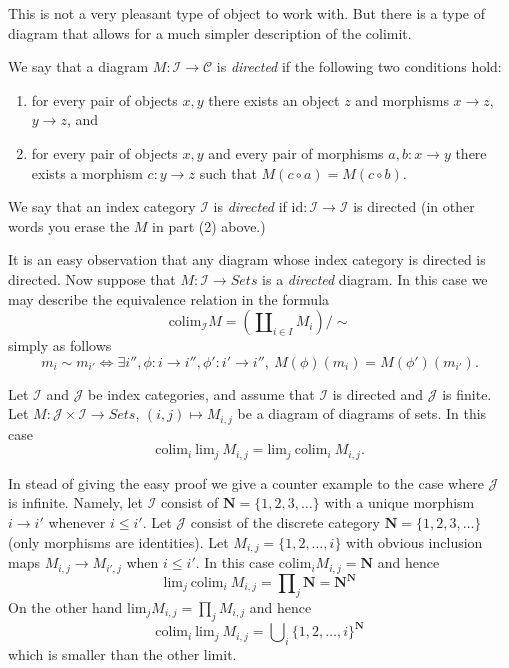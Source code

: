 \medskip\noindent
This is not a very pleasant type of object to work with.
But there is a type of diagram that allows for a much simpler
description of the colimit.

\begin{definition}
\label{definition-directed}
We say that a diagram $M : \mathcal{I} \to \mathcal{C}$ is {\it directed}
if the following two conditions hold:
\begin{enumerate}
\item for every pair of objects $x, y$ 
there exists an object $z$ and morphisms $x \to z$,
$y \to z$, and
\item for every pair of objects $x, y$ and every pair of
morphisms $a, b : x \to y$ there exists a morphism
$c : y \to z$ such that $M(c \circ a) = M(c \circ b)$.
\end{enumerate}
We say that an index category $\mathcal{I}$ is {\it directed} if
$\text{id} : \mathcal{I} \to \mathcal{I}$ is directed (in other words
you erase the $M$ in part (2) above.)
\end{definition}

\noindent
It is an easy observation that any diagram whose index category is
directed is directed. Now suppose that $M : \mathcal{I} \to
\textit{Sets}$ is a {\it directed} diagram. In this case we may
describe the equivalence relation in the formula
$$
\text{colim}_{\mathcal{I}} M
=
(\coprod\nolimits_{i\in I} M_i)/\sim
$$
simply as follows
$$
m_i \sim m_{i'} 
\Leftrightarrow
\exists i'', \phi : i \to i'', \phi': i' \to i'',\ 
M(\phi)(m_i) = M(\phi')(m_{i'}).
$$

\begin{lemma}
\label{lemma-directed-commutes}
Let $\mathcal{I}$ and $\mathcal{J}$ be index categories,
and assume that $\mathcal{I}$ is directed and $\mathcal{J}$
is finite. Let
$M : \mathcal{J} \times \mathcal{I} \to \textit{Sets}$,
$(i,j) \mapsto M_{i,j}$ be a diagram of diagrams of sets.
In this case
$$
\text{colim}_i\ \text{lim}_j\ M_{i,j} 
=
\text{lim}_j\ \text{colim}_i\ M_{i,j}. 
$$
\end{lemma}

\noindent
In stead of giving the easy proof we give a counter example to
the case where $\mathcal{J}$ is infinite. Namely, let
$\mathcal{I}$ consist of $\mathbf{N} = \{1,2,3,\ldots\}$
with a unique morphism $i \to i'$ whenever $i \leq i'$.
Let $\mathcal{J}$ consist of the discrete category
$\mathbf{N} = \{1,2,3,\ldots\}$ (only morphisms are identities).
Let $M_{i,j} = \{1,2,\ldots,i\}$ with obvious inclusion maps
$M_{i,j} \to M_{i',j}$ when $i \leq i'$. In this case
$\text{colim}_i M_{i,j} = \mathbf{N}$ and hence
$$
\text{lim}_j\ \text{colim}_i\ M_{i,j}
=
\prod\nolimits_j \mathbf{N}
=
\mathbf{N}^\mathbf{N}
$$
On the other hand $\text{lim}_j M_{i,j} = \prod\nolimits_j M_{i,j}$ and
hence
$$
\text{colim}_i\ \text{lim}_j\ M_{i,j}
=
\bigcup\nolimits_i \{1,2, \ldots, i\}^{\mathbf{N}}
$$
which is smaller than the other limit.

